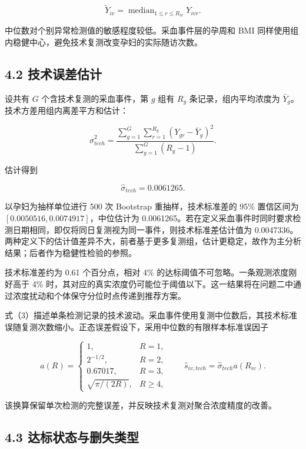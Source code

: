 \documentclass[UTF8,fontset=fandol,zihao=-4,a4paper]{ctexart}
\begin{document}
\[
\widetilde Y_{iv}
=\operatorname{median}_{1\le r\le R_{iv}}Y_{ivr}.
\tag{1}
\]

中位数对个别异常检测值的敏感程度较低。采血事件层的孕周和 BMI
同样使用组内稳健中心，避免技术复测改变孕妇的实际随访次数。

\subsection{4.2
技术误差估计}\label{ux6280ux672fux8befux5deeux4f30ux8ba1}

设共有 \(G\) 个含技术复测的采血事件，第 \(g\) 组有 \(R_g\)
条记录，组内平均浓度为 \(\bar Y_g\)。技术方差用组内离差平方和估计：

\[
\widehat\sigma_{tech}^{2}
=
\frac{
\displaystyle\sum_{g=1}^{G}\sum_{r=1}^{R_g}
(Y_{gr}-\bar Y_g)^2
}{
\displaystyle\sum_{g=1}^{G}(R_g-1)
}.
\tag{2}
\]

估计得到

\[
\widehat\sigma_{tech}=0.0061265.
\tag{3}
\]

以孕妇为抽样单位进行 500 次 Bootstrap 重抽样，技术标准差的 95\% 置信区间为
\([0.0050516,0.0074917]\)，中位估计为 0.0061265。若在定义采血事件时同时要求检测日期相同，即仅将同日复测视为同一事件，则技术标准差估计值为
0.0047336。两种定义下的估计值差异不大，前者基于更多复测组，估计更稳定，故作为主分析结果；后者作为稳健性检验的参照。

技术标准差约为 0.61 个百分点，相对 4\%
的达标阈值不可忽略。一条观测浓度刚好高于 4\%
时，其对应的真实浓度仍可能位于阈值以下。这一结果将在问题二中通过浓度扰动和个体保守分位时点传递到推荐方案。

式（3）描述单条检测记录的技术波动。采血事件使用复测中位数后，其技术标准误随复测次数缩小。正态误差假设下，采用中位数的有限样本标准误因子

\[
a(R)=
\begin{cases}
1, & R=1,\\
2^{-1/2}, & R=2,\\
0.67017, & R=3,\\
\sqrt{\pi/(2R)}, & R\ge4,
\end{cases}
\qquad
\widehat s_{iv,tech}=\widehat\sigma_{tech}a(R_{iv}).
\tag{3a}
\]

该换算保留单次检测的完整误差，并反映技术复测对聚合浓度精度的改善。

\subsection{4.3
达标状态与删失类型}\label{ux8fbeux6807ux72b6ux6001ux4e0eux5220ux5931ux7c7bux578b}
\end{document}
